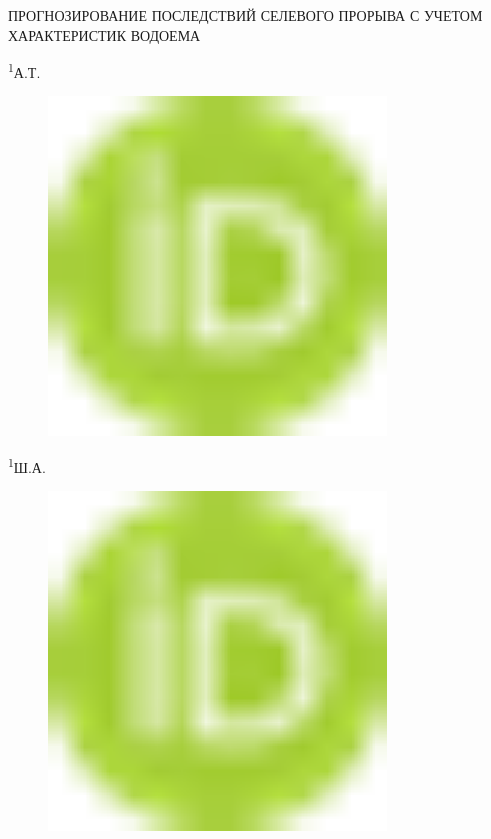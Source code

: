 
ПРОГНОЗИРОВАНИЕ ПОСЛЕДСТВИЙ СЕЛЕВОГО ПРОРЫВА С УЧЕТОМ ХАРАКТЕРИСТИК
ВОДОЕМА

\textsuperscript{1}А.Т.
\begin{figure}[H]
	\centering
	\includegraphics[width=0.8\textwidth]{media/ict/image1}
	\caption*{}
\end{figure}

\textsuperscript{1}Ш.А.
\begin{figure}[H]
	\centering
	\includegraphics[width=0.8\textwidth]{media/ict/image1}
	\caption*{}
\end{figure}

